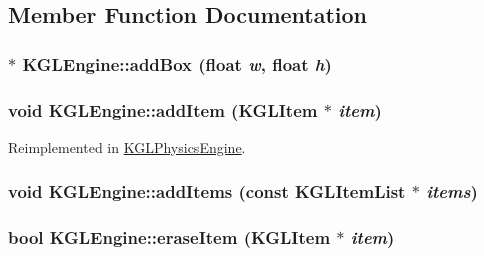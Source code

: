 \subsection{Member Function Documentation}
\hypertarget{class_k_g_l_engine_428426702fca3958cc3ee41149312d68}{
\subsubsection[{addBox}]{$\ast$ KGLEngine::addBox (float {\em w}, \/  float {\em h})}}
\label{class_k_g_l_engine_428426702fca3958cc3ee41149312d68}


\hypertarget{class_k_g_l_engine_4aa9d5809d76cc44994a1cdb9df6f3ec}{
\subsubsection[{addItem}]{\setlength{\rightskip}{0pt plus 5cm}void KGLEngine::addItem ({\bf KGLItem} $\ast$ {\em item})}}
\label{class_k_g_l_engine_4aa9d5809d76cc44994a1cdb9df6f3ec}




Reimplemented in \hyperlink{class_k_g_l_physics_engine_eefe31c558a83c43d1840987cdea1898}{KGLPhysicsEngine}.\hypertarget{class_k_g_l_engine_0b25939d43f254ed6650bf9cded68f60}{
\subsubsection[{addItems}]{\setlength{\rightskip}{0pt plus 5cm}void KGLEngine::addItems (const {\bf KGLItemList} $\ast$ {\em items})}}
\label{class_k_g_l_engine_0b25939d43f254ed6650bf9cded68f60}


\hypertarget{class_k_g_l_engine_66aa5b9783823cf7db5edcc50981999a}{
\subsubsection[{eraseItem}]{\setlength{\rightskip}{0pt plus 5cm}bool KGLEngine::eraseItem ({\bf KGLItem} $\ast$ {\em item})}}
\label{class_k_g_l_engine_66aa5b9783823cf7db5edcc50981999a}


